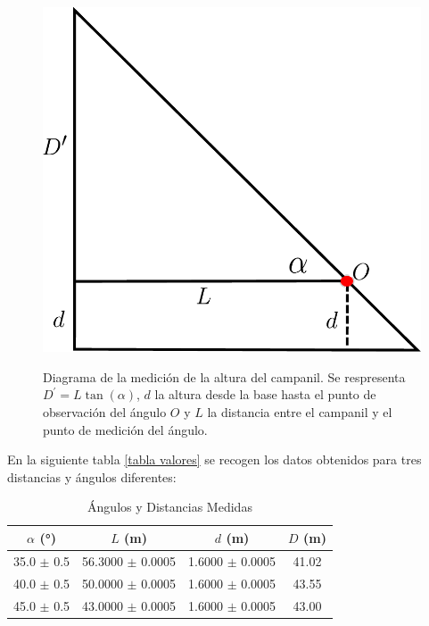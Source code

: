 \documentclass[10pt,a4paper]{article}
\begin{document}
\begin{multicols}{2}
		
		\begin{figure}[H]
			\centering
			\includegraphics[scale=0.4]{IMG/camp.pdf} 
			\label{grafico campanil}
			\caption{Diagrama de la medición de la altura del campanil. Se respresenta $D^{\prime} = L \tan(\alpha)$,  $d$ la altura desde la base hasta el punto de observación del ángulo $O$ y $L$ la distancia entre el campanil y el punto de medición del ángulo.}
		\end{figure}
		
	En la siguiente tabla \ref{tabla valores} se recogen los datos obtenidos para tres distancias y ángulos diferentes:
	\end{multicols}
	
	\begin{table}[H]\label{tabla valores}
	\centering
\begin{tabular}{|c|c|c|c|}
\hline
\textbf{$\alpha$ (°)} & $L$ (m) & $d$ (m)&  $D$ (m) \\ \hline
35.0 $\pm$ 0.5  & 56.3000 $\pm$ 0.0005 &  1.6000 $\pm$ 0.0005 & 41.02 \\ 
40.0 $\pm$ 0.5 & 50.0000 $\pm$ 0.0005 & 1.6000 $\pm$ 0.0005 & 43.55 \\ 
45.0 $\pm$ 0.5 & 43.0000 $\pm$ 0.0005 & 1.6000 $\pm$ 0.0005 &  43.00 \\ \hline
\end{tabular}
\caption{Ángulos y Distancias Medidas}
\label{tab:angulos_distancias.}
\end{table}
\end{document}
